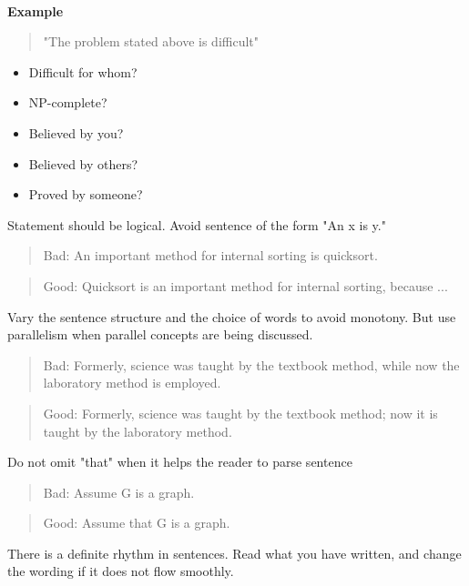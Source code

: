 \documentclass[]{report}
\begin{document}
\begin{description}
  \paragraph{}
 \textbf {\large {Example}} 
 \begin{verse}
 "The problem stated above is difficult"
 \end{verse}
  \begin{itemize}
  \item Difficult for whom?
  \item NP-complete?
  \item Believed by you?
  \item Believed by others?
  \item Proved by
someone?
  \end{itemize}
  \item[**  ] Statement should be logical. Avoid sentence of the form
"An x is y."
\begin{verse}
{\large Bad:} An important method for internal sorting is
quicksort.
\end{verse}
\begin{verse}
{\large Good:} Quicksort is an important method for internal
sorting, because ...
\end{verse}
\item[**  ] Vary the sentence structure and the choice of words to
avoid monotony. But use parallelism when parallel
concepts are being discussed.
\begin{verse}
{\large Bad:} Formerly, science was taught by the textbook
method, while now the laboratory method is
employed.
\end{verse}
\begin{verse}
{\large Good:} Formerly, science was taught by the textbook
method; now it is taught by the laboratory
method.
\end{verse}

\item[**  ] Do not omit "that" when it helps the reader to parse
sentence
\begin{verse}
{\large Bad:} Assume G is a graph.
\end{verse}
\begin{verse}
{\large Good:} Assume that G is a graph.
\end{verse}
  
  \item[**  ] There is a definite rhythm in sentences. Read what you
have written, and change the wording if it does not flow
smoothly.

\end{description}
\end{document}
